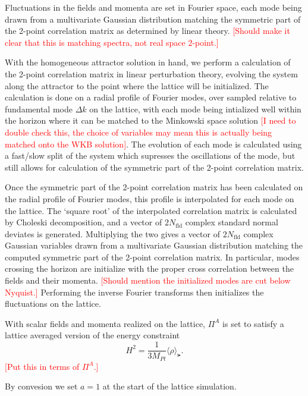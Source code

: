 Fluctuations in the fields and momenta are set in Fourier space, each mode being drawn from a multivariate Gaussian distribution matching the symmetric part of the 2-point correlation matrix as determined by linear theory. \textcolor{red}{[Should make it clear that this is matching spectra, not real space 2-point.]}

With the homogeneous attractor solution in hand, we perform a calculation of the 2-point correlation matrix in linear perturbation theory, evolving the system along the attractor to the point where the lattice will be initialized. The calculation is done on a radial profile of Fourier modes, over sampled relative to fundamental mode $\Delta k$ on the lattice, with each mode being intialized well within the horizon where it can be matched to the Minkowski space solution \textcolor{red}{[I need to double check this, the choice of variables may mean this is actually being matched onto the WKB solution]}. The evolution of each mode is calculated using a fast/slow split of the system which supresses the oscillations of the mode, but still allows for calculation of the symmetric part of the 2-point correlation matrix.

Once the symmetric part of the 2-point correlation matrix has been calculated on the radial profile of Fourier modes, this profile is interpolated for each mode on the lattice. The `square root' of the interpolated correlation matrix is calculated by Choleski decomposition, and a vector of $2N_\mathrm{fld}$ complex standard normal deviates is generated. Multiplying the two gives a vector of $2N_\mathrm{fld}$ complex Gaussian variables drawn from a multivariate Gaussian distribution matching the computed symmetric part of the 2-point correlation matrix. In particular, modes crossing the horizon are initialize with the proper cross correlation between the fields and their momenta. \textcolor{red}{[Should mention the initialized modes are cut below Nyquist.]} Performing the inverse Fourier transforms then initializes the fluctuations on the lattice.

With scalar fields and momenta realized on the lattice, $\Pi^A$ is set to satisfy a lattice averaged version of the energy constraint
\begin{equation} \label{eq:energy constraint}
  H^2 = \frac{1}{3M_{Pl}}\langle \rho \rangle_\lat.
\end{equation}
\textcolor{red}{[Put this in terms of $\Pi^A$.]}

By convesion we set $a=1$ at the start of the lattice simulation.

